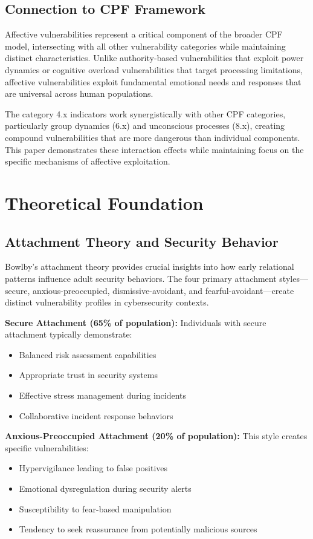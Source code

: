\documentclass[11pt,a4paper]{article}
\begin{document}
\subsection{Connection to CPF Framework}

Affective vulnerabilities represent a critical component of the broader CPF model, intersecting with all other vulnerability categories while maintaining distinct characteristics. Unlike authority-based vulnerabilities that exploit power dynamics or cognitive overload vulnerabilities that target processing limitations, affective vulnerabilities exploit fundamental emotional needs and responses that are universal across human populations.

The category 4.x indicators work synergistically with other CPF categories, particularly group dynamics (6.x) and unconscious processes (8.x), creating compound vulnerabilities that are more dangerous than individual components. This paper demonstrates these interaction effects while maintaining focus on the specific mechanisms of affective exploitation.

\section{Theoretical Foundation}

\subsection{Attachment Theory and Security Behavior}

Bowlby's attachment theory\cite{bowlby1969} provides crucial insights into how early relational patterns influence adult security behaviors. The four primary attachment styles—secure, anxious-preoccupied, dismissive-avoidant, and fearful-avoidant—create distinct vulnerability profiles in cybersecurity contexts.

\textbf{Secure Attachment (65\% of population):}
Individuals with secure attachment typically demonstrate:
\begin{itemize}
\item Balanced risk assessment capabilities
\item Appropriate trust in security systems
\item Effective stress management during incidents
\item Collaborative incident response behaviors
\end{itemize}

\textbf{Anxious-Preoccupied Attachment (20\% of population):}
This style creates specific vulnerabilities:
\begin{itemize}
\item Hypervigilance leading to false positives
\item Emotional dysregulation during security alerts
\item Susceptibility to fear-based manipulation
\item Tendency to seek reassurance from potentially malicious sources
\end{itemize}
\end{document}
